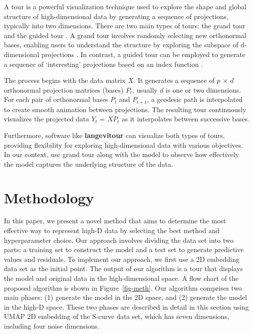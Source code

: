 \documentclass[
  12pt]{article}
\begin{document}
A tour is a powerful visualization technique used to explore the shape
and global structure of high-dimensional data by generating a sequence
of projections, typically into two dimensions. There are two main types
of tours: the grand tour \citep{Asimov1985} and the guided tour
\citep{article29}. A grand tour involves randomly selecting new
orthonormal bases, enabling users to understand the structure by
exploring the subspace of d-dimensional projections \citep{Asimov1985}.
In contrast, a guided tour can be employed to generate a sequence of
`interesting' projections based on an index function \citep{article29}.

The process begins with the data matrix \(X\). It generates a sequence
of \(p\) × \(d\) orthonormal projection matrices (bases) \(P_t\),
usually \(d\) is one or two dimensions. For each pair of orthonormal
bases \(P_t\) and \(P_{t+1}\), a geodesic path is interpolated to create
smooth animation between projections. The resulting tour continuously
visualizes the projected data \(Y_t\) = \(XP_t\) as it interpolates
between successive bases.

Furthermore, software like \textbf{langevitour} can visualize both types
of tours, providing flexibility for exploring high-dimensional data with
various objectives. In our context, use grand tour along with the model
to observe how effectively the model captures the underlying structure
of the data.

\hypertarget{sec-methods}{%
\section{Methodology}\label{sec-methods}}

In this paper, we present a novel method that aims to determine the most
effective way to represent high-D data by selecting the best method and
hyperparameter choice. Our approach involves dividing the data set into
two parts: a training set to construct the model and a test set to
generate predictive values and residuals. To implement our approach, we
first use a 2D embedding data set as the initial point. The output of
our algorithm is a tour that displays the model and original data in the
high-dimensional space. A flow chart of the proposed algorithm is shown
in Figure~\ref{fig-meth}. Our algorithm comprises two main phases: (1)
generate the model in the 2D space, and (2) generate the model in the
high-D space. These two phases are described in detail in this section
using UMAP 2D embedding of the S-curve data set, which has seven
dimensions, including four noise dimensions.
\end{document}
